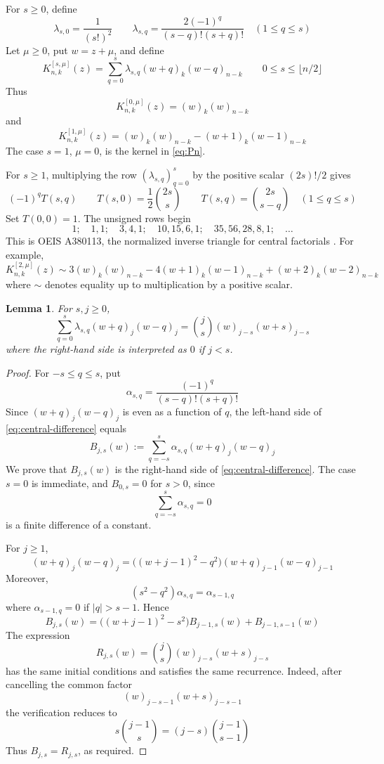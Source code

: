 \documentclass[a4paper,11pt,reqno]{amsart}
\numberwithin{equation}{section}
\newtheorem{lemma}{Lemma}
\theoremstyle{remark}
\begin{document}
For \(s\geq0\), define
\[
  \lambda_{s,0}=\frac{1}{(s!)^2}
  \qquad
  \lambda_{s,q}=\frac{2(-1)^q}{(s-q)!(s+q)!}
  \quad (1\leq q\leq s)
\]
Let \(\mu\geq0\), put \(w=z+\mu\), and define
\begin{equation}\label{eq:kernel}
  K_{n,k}^{[s,\mu]}(z)=
  \sum_{q=0}^{s}
  \lambda_{s,q}(w+q)_k(w-q)_{n-k}
  \qquad
  0\leq s\leq\lfloor n/2\rfloor 
\end{equation}
Thus
\[
  K_{n,k}^{[0,\mu]}(z)=(w)_k(w)_{n-k}
\]
and
\[
  K_{n,k}^{[1,\mu]}(z)
  =
  (w)_k(w)_{n-k}-(w+1)_k(w-1)_{n-k}
\]
The case \(s=1\), \(\mu=0\), is the kernel in \eqref{eq:Pn}.

For \(s\geq1\), multiplying the row \((\lambda_{s,q})_{q=0}^{s}\) by the positive scalar \((2s)!/2\) gives
\[
  (-1)^qT(s,q)
  \qquad
  T(s,0)=\frac12\binom{2s}{s}
  \qquad
  T(s,q)=\binom{2s}{s-q}\quad(1\leq q\leq s)
\]
Set \(T(0,0)=1\). The unsigned rows begin
\[
  1;\quad
  1,1;\quad
  3,4,1;\quad
  10,15,6,1;\quad
  35,56,28,8,1;\quad\ldots
\]
This is OEIS A380113, the normalized inverse triangle for central factorials \cite{OEISA380113}. For example,
\[
  K_{n,k}^{[2,\mu]}(z)
  \sim
  3(w)_k(w)_{n-k}
  -4(w+1)_k(w-1)_{n-k}
  +(w+2)_k(w-2)_{n-k}
\]
where \(\sim\) denotes equality up to multiplication by a positive scalar.

\begin{lemma}\label{lem:central-difference}
For \(s,j\geq0\),
\begin{equation}\label{eq:central-difference}
  \sum_{q=0}^{s}
  \lambda_{s,q}(w+q)_j(w-q)_j
  =
  \binom{j}{s}(w)_{j-s}(w+s)_{j-s}
\end{equation}
where the right-hand side is interpreted as \(0\) if \(j<s\).
\end{lemma}

\begin{proof}
For \(-s\leq q\leq s\), put
\[
  \alpha_{s,q}=
  \frac{(-1)^q}{(s-q)!(s+q)!}
\]
Since \((w+q)_j(w-q)_j\) is even as a function of \(q\), the left-hand side of \eqref{eq:central-difference} equals
\[
  B_{j,s}(w):=
  \sum_{q=-s}^{s}\alpha_{s,q}(w+q)_j(w-q)_j
\]
We prove that \(B_{j,s}(w)\) is the right-hand side of \eqref{eq:central-difference}. The case \(s=0\) is immediate, and \(B_{0,s}=0\) for \(s>0\), since
\[
  \sum_{q=-s}^{s}\alpha_{s,q}=0
\]
is a finite difference of a constant.

For \(j\geq1\),
\[
  (w+q)_j(w-q)_j
  =
  \bigl((w+j-1)^2-q^2\bigr)(w+q)_{j-1}(w-q)_{j-1}
\]
Moreover,
\[
  (s^2-q^2)\alpha_{s,q}=\alpha_{s-1,q}
\]
where \(\alpha_{s-1,q}=0\) if \(|q|>s-1\). Hence
\[
  B_{j,s}(w)
  =
  \bigl((w+j-1)^2-s^2\bigr)B_{j-1,s}(w)
  +
  B_{j-1,s-1}(w)
\]
The expression
\[
  R_{j,s}(w)=\binom{j}{s}(w)_{j-s}(w+s)_{j-s}
\]
has the same initial conditions and satisfies the same recurrence. Indeed, after cancelling the common factor
\[
  (w)_{j-s-1}(w+s)_{j-s-1}
\]
the verification reduces to
\[
  s\binom{j-1}{s}=(j-s)\binom{j-1}{s-1}
\]
Thus \(B_{j,s}=R_{j,s}\), as required.
\end{proof}
\end{document}
